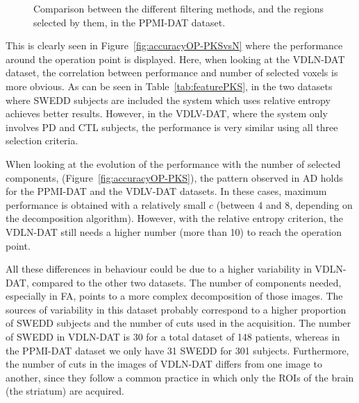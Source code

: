 \begin{figure}[bth]
	\caption[Comparison between the different filtering methods in PPMI-DAT.]{Comparison between the different filtering methods, and the regions selected by them, in the PPMI-DAT dataset. }\label{fig:comparisonSelection_ppmidat}
\end{figure}

This is clearly seen in Figure~\ref{fig:accuracyOP-PKSvsN} where the performance around the operation point is displayed. Here, when looking at the VDLN-DAT dataset, the correlation between performance and number of selected voxels is more obvious. As can be seen in Table~\ref{tab:featurePKS}, in the two datasets where \ac{SWEDD} subjects are included the system which uses relative entropy achieves better results. However, in the VDLV-DAT, where the system only involves \ac{PD} and \ac{CTL} subjects, the performance is very similar using all three selection criteria. 

When looking at the evolution of the performance with the number of selected components, (Figure~\ref{fig:accuracyOP-PKS}), the pattern observed in \ac{AD} holds for the PPMI-DAT and the VDLV-DAT datasets. In these cases, maximum performance is obtained with a relatively small $c$ (between 4 and 8, depending on the decomposition algorithm). However, with the relative entropy criterion, the VDLN-DAT still needs a higher number (more than 10) to reach the operation point. 

All these differences in behaviour could be due to a higher variability in VDLN-DAT, compared to the other two datasets. The number of components needed, especially in \ac{FA}, points to a more complex decomposition of those images. The sources of variability in this dataset probably correspond to a higher proportion of \ac{SWEDD} subjects and the number of cuts used in the acquisition. The number of \ac{SWEDD} in VDLN-DAT is 30 for a total dataset of 148 patients, whereas in the PPMI-DAT dataset we only have 31 \ac{SWEDD} for 301 subjects. Furthermore, the number of cuts in the images of VDLN-DAT differs from one image to another, since they follow a common practice in which only the \acp{ROI} of the brain (the striatum) are acquired. 

